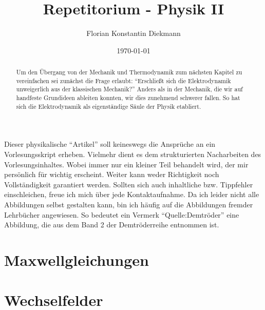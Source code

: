
\title{Repetitorium - Physik II}
\author{Florian Konstantin Diekmann}
\date{\today}



\maketitle
\vspace{3cm}
\begin{abstract}
Um den Übergang von der Mechanik und Thermodynamik zum nächsten Kapitel zu vereinfachen sei zunächst die Frage erlaubt: "`Erschließt sich die Elektrodynamik unweigerlich aus der klassischen Mechanik?"' Anders als in der Mechanik, die wir auf handfeste Grundideen ableiten konnten, wir dies zunehmend schwerer fallen. So hat sich die Elektrodynamik als eigenständige Säule der Physik etabliert. 
\end{abstract}
  

Dieser physikalische "`Artikel"' soll keineswegs die Ansprüche an ein Vorlesungsskript erheben. Vielmehr dient es  
dem strukturierten Nacharbeiten des Vorlesungsinhaltes. Wobei immer nur ein kleiner Teil behandelt wird, der mir persönlich für wichtig erscheint. Weiter kann weder   Richtigkeit noch  Vollständigkeit  garantiert werden. Sollten sich auch  inhaltliche bzw. Tippfehler einschleichen, freue ich mich über jede Kontaktaufnahme.
Da ich leider nicht alle Abbildungen selbst gestalten kann, bin ich häufig auf die Abbildungen fremder Lehrbücher angewiesen. So bedeutet ein Vermerk "`Quelle:Demtröder"' eine Abbildung, die aus dem Band 2 der Demtröderreihe entnommen ist.
\newpage
\tableofcontents
\newpage
%
%

\newpage

\newpage


\section{Maxwellgleichungen}
\section{Wechselfelder}

